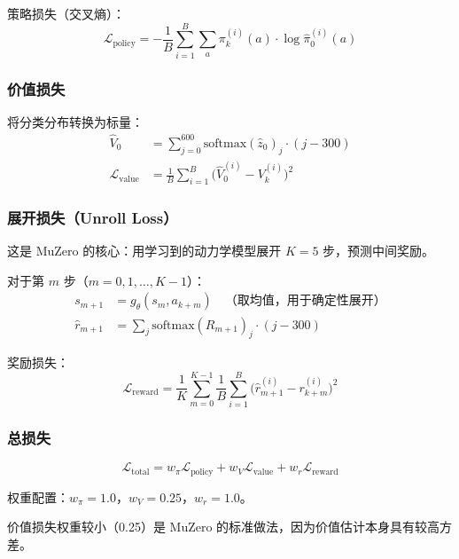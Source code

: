 \documentclass[UTF8, a4paper]{ctexart}
\begin{document}
策略损失（交叉熵）：
\begin{equation}
\boxed{\mathcal{L}_{\text{policy}} = -\frac{1}{B} \sum_{i=1}^{B} \sum_{a} \pi_k^{(i)}(a) \cdot \log \hat{\pi}_0^{(i)}(a)}
\end{equation}

\subsubsection{价值损失}

将分类分布转换为标量：
\begin{align}
\hat{V}_0 &= \sum_{j=0}^{600} \text{softmax}(\hat{z}_0)_j \cdot (j - 300) \\
\mathcal{L}_{\text{value}} &= \frac{1}{B} \sum_{i=1}^{B} \big(\hat{V}_0^{(i)} - V_k^{(i)}\big)^2
\end{align}

\subsubsection{展开损失（Unroll Loss）}

这是 MuZero 的核心：用学习到的动力学模型展开 $K = 5$ 步，预测中间奖励。

对于第 $m$ 步（$m = 0, 1, \dots, K-1$）：
\begin{align}
s_{m+1} &= g_\theta(s_m, a_{k+m}) \quad \text{（取均值，用于确定性展开）} \\
\hat{r}_{m+1} &= \sum_{j} \text{softmax}(R_{m+1})_j \cdot (j - 300)
\end{align}

奖励损失：
\begin{equation}
\boxed{\mathcal{L}_{\text{reward}} = \frac{1}{K} \sum_{m=0}^{K-1} \frac{1}{B} \sum_{i=1}^{B} \big(\hat{r}_{m+1}^{(i)} - r_{k+m}^{(i)}\big)^2}
\end{equation}

\subsubsection{总损失}

\begin{equation}
\boxed{\mathcal{L}_{\text{total}} = w_\pi \mathcal{L}_{\text{policy}} + w_V \mathcal{L}_{\text{value}} + w_r \mathcal{L}_{\text{reward}}}
\end{equation}

权重配置：$w_\pi = 1.0$，$w_V = 0.25$，$w_r = 1.0$。

价值损失权重较小（0.25）是 MuZero 的标准做法，因为价值估计本身具有较高方差。
\end{document}
